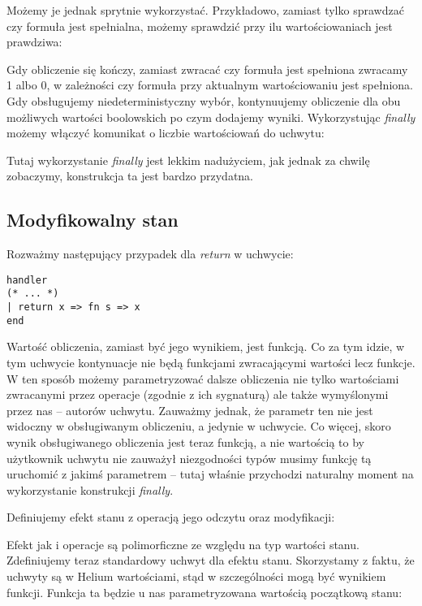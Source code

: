 Możemy je jednak sprytnie wykorzystać. Przykładowo, zamiast tylko sprawdzać czy formuła jest spełnialna, możemy sprawdzić przy ilu wartościowaniach jest prawdziwa:



Gdy obliczenie się kończy, zamiast zwracać czy formuła jest spełniona zwracamy 1 albo 0, w zależności czy formuła przy aktualnym wartościowaniu jest spełniona. Gdy obsługujemy niedeterministyczny wybór, kontynuujemy obliczenie dla obu możliwych wartości boolowskich po czym dodajemy wyniki. Wykorzystując \textit{finally} możemy włączyć komunikat o liczbie wartościowań do uchwytu:



Tutaj wykorzystanie \textit{finally} jest lekkim nadużyciem, jak jednak za chwilę zobaczymy, konstrukcja ta jest bardzo przydatna.

\subsection{Modyfikowalny stan}

Rozważmy następujący przypadek dla \textit{return} w uchwycie:

\begin{lstlisting}
handler
(* ... *)
| return x => fn s => x
end
\end{lstlisting}

Wartość obliczenia, zamiast być jego wynikiem, jest funkcją. Co za tym idzie, w tym uchwycie kontynuacje nie będą funkcjami zwracającymi wartości lecz funkcje. W ten sposób możemy parametryzować dalsze obliczenia nie tylko wartościami zwracanymi przez operacje (zgodnie z ich sygnaturą) ale także wymyślonymi przez nas -- autorów uchwytu. Zauważmy jednak, że parametr ten nie jest widoczny w obsługiwanym obliczeniu, a jedynie w uchwycie. Co więcej, skoro wynik obsługiwanego obliczenia jest teraz funkcją, a nie wartością to by użytkownik uchwytu nie zauważył niezgodności typów musimy funkcję tą uruchomić z jakimś parametrem -- tutaj właśnie przychodzi naturalny moment na wykorzystanie konstrukcji \textit{finally}.

Definiujemy efekt stanu z operacją jego odczytu oraz modyfikacji:



Efekt jak i operacje są polimorficzne ze względu na typ wartości stanu. Zdefiniujemy teraz standardowy uchwyt dla efektu stanu. Skorzystamy z faktu, że uchwyty są w Helium wartościami, stąd w szczególności mogą być wynikiem funkcji. Funkcja ta będzie u nas parametryzowana wartością początkową stanu:

